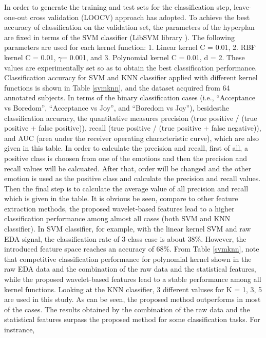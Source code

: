 In order to generate the training and test sets for the classification step, leave-one-out cross validation (LOOCV)
approach has adopted. To achieve the best accuracy of classification on the validation set, the parameters of the 
hyperplan are fixed in terms of the SVM classifier (LibSVM library \cite{chang2011libsvm}). 
The following parameters are used for each kernel function: 1. Linear kernel C = 0.01, 2. RBF kernel C = 0.01, $\gamma$= 0.001, 
and 3. Polynomial kernel C = 0.01, d = 2. These values are experimentally set so as to obtain the best classification performance.\\

Classification accuracy for SVM and KNN classifier applied with different kernel functions is shown in Table \ref{svmknn},
and the dataset acquired from 64 annotated subjects. In terms of the binary classification cases (i.e., “Acceptance vs 
Boredom”, “Acceptance vs Joy”, and “Boredom vs Joy”), besidesthe classification accuracy, the quantitative measures 
precision (true positive / (true positive + false positive)), recall (true positive / (true positive + false negative)), 
and AUC (area under the receiver operating characteristic curve), which are also given in this table. In order to 
calculate the precision and recall, first of all, a positive class is choosen from one of the emotions and then the 
precision and recall values will be calcuated. After that, order will be changed and the other emotion is used as
the positive class and calculate the precision and recall values. Then the final step is to calculate the average value
of all precision and recall which is given in the table. It is obvious be seen, compare to other feature extraction
methods, the proposed wavelet-based features lead to a higher classification performance among almost all cases (both
SVM and KNN classifier). In SVM classifier, for example, with the linear kernel SVM and raw EDA signal, the classification
rate of 3-class case is about 38\%. However, the introduced feature space reaches an accuracy of 68\%. From Table \ref{svmknn}, 
note that competitive classification performance for polynomial kernel shown in the raw EDA data and the combination of 
the raw data and the statistical features, while the proposed wavelet-based features lead to a stable performance among
all kernel functions. Looking at the KNN classifier, 3 different valuses for K = 1, 3, 5 are used in this study.
As can be seen, the proposed method outperforms in most of the cases. The results obtained by the combination of the 
raw data and the statistical features surpass the proposed method for some classification tasks. For instrance,

